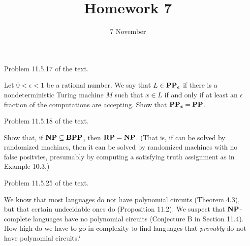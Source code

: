 \documentclass{../math167}
\title{Homework 7}
\author{}
\date{7 November}
\begin{document}
\begin{problems}
\item Problem 11.5.17 of the text.

  \begin{book}
    \newcommand{\PPe}{\PP_\mathbfit\epsilon}

    Let \(0 < \epsilon < 1\) be a rational number.  We say that
    \(L \in \PPe\) if there is a nondeterministic Turing machine \(M\)
    such that \(x \in L\) if and only if at least an \(\epsilon\)
    fraction of the computations are accepting.  Show that
    \(\PPe = \PP\).
  \end{book}

  \begin{solution}
  \end{solution}

\item Problem 11.5.18 of the text.

  \begin{book}
    Show that, if \(\mathbf{NP} \subseteq \mathbf{BPP}\), then \(\mathbf{RP} = \mathbf{NP}\).  (That
    is, if \SAT{} can be solved by randomized machines, then it can be
    solved by randomized machines with no false positvies, presumably
    by computing a satisfying truth assignment as in Example 10.3.)
  \end{book}

  \begin{solution}
  \end{solution}

\item Problem 11.5.25 of the text.

  \begin{book}
    We know that most languages do not have polynomial circuits
    (Theorem 4.3), but that certain undecidable ones do (Proposition
    11.2).  We suspect that \(\mathbf{NP}\)-complete languages have no
    polynomial circuits (Conjecture B in Section 11.4).  How high do
    we have to go in complexity to find languages that \emph{provably}
    do not have polynomial circuits?
  \end{book}

  \begin{solution}
  \end{solution}

\end{problems}
\end{document}
